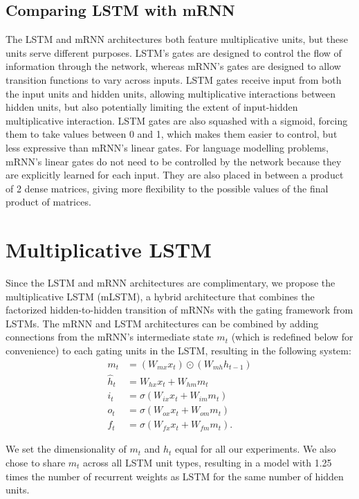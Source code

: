 \documentclass{article}
\begin{document}
\subsection{Comparing LSTM with mRNN}
 


The LSTM and mRNN architectures both feature multiplicative units, but these units serve different purposes. LSTM's gates are designed to control the flow of information through the network, whereas mRNN's gates are designed to allow transition functions to vary across inputs. LSTM gates receive input from both the input units and hidden units, allowing multiplicative interactions between hidden units, but also potentially limiting the extent of input-hidden multiplicative interaction. LSTM gates are also squashed with a sigmoid, forcing them to take values between 0 and 1, which makes them easier to control, but less expressive than mRNN's linear gates. For language modelling problems, mRNN's linear gates do not need to be controlled by the network because they are explicitly learned for each input. They are also placed in between a product of 2 dense matrices, giving more flexibility to the possible values of the final product of matrices.




\section{Multiplicative LSTM}
Since the LSTM and mRNN architectures are complimentary, we propose the multiplicative LSTM (mLSTM), a hybrid architecture that combines the factorized hidden-to-hidden transition of mRNNs with the gating framework from LSTMs. The mRNN and LSTM architectures can be combined by adding connections from the mRNN's intermediate state $m_t$ (which is redefined below for convenience) to each gating units in the LSTM, resulting in the following system:
\begin{align}
m_t &= (W_{mx} x_t) \odot (W_{mh}h_{t-1}) \\
\hat{h}_t &= W_{hx}x_t + W_{hm}m_{t} \\
i_t &= \sigma(W_{ix}x_t + W_{im}m_{t}) \\
o_t &= \sigma(W_{ox}x_t + W_{om}m_{t}) \\
f_t &= \sigma(W_{fx}x_t + W_{fm}m_{t}).
\end{align}

We set the dimensionality of $m_t$ and $h_t$ equal for all our experiments. We also chose to share $m_t$ across all LSTM unit types, resulting in a model with 1.25 times the number of recurrent weights as LSTM for the same number of hidden units.
\end{document}
